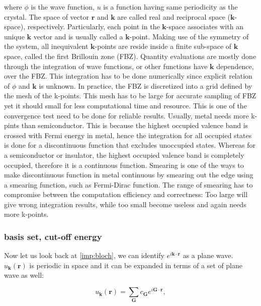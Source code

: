 where $\phi$ is the wave function, $u$ is a function having same periodicity as the crystal. The space of vector $\mathbf{r}$ and $\mathbf{k}$ are called real and reciprocal space ($\mathbf{k}$-space), respectively. Particularly, each point in the $\mathbf{k}$-space associates with an unique $\mathbf{k}$ vector and is usually called a $\mathbf{k}$-point. Making use of the symmetry of the system, all inequivalent $\mathbf{k}$-points are reside inside a finite sub-space of $\mathbf{k}$ space, called the first Brillouin zone (FBZ). Quantity evaluations are mostly done through the integration of wave functions, or other functions have $\mathbf{k}$ dependence, over the FBZ. This integration has to be done numerically since explicit relation of $\phi$ and $\mathbf{k}$ is unknown. In practice, the FBZ is discretized into a grid defined by the mesh of the k-points. This mesh has to be large for accurate sampling of FBZ yet it should small for less computational time and resource. This is one of the convergence test need to be done for reliable results. Usually, metal needs more k-pints than semiconductor. This is because the highest occupied valence band is crossed with Fermi energy in metal, hence the integration for all occupied states is done for a discontinuous function that excludes unoccupied states.  Whereas for a semiconductor or insulator, the highest occupied valence band is completely occupied, therefore it is a continuous function. Smearing is one of the ways to make discontinuous function in metal continuous by smearing out the edge using a smearing function, such as Fermi-Dirac function. The range of smearing has to compromise between the computation efficiency and correctness: Too large will give wrong integration results, while too small become useless and again needs more k-points.

\subsubsection{basis set, cut-off energy }

Now let us look back at \autoref{imp:bloch}, we can identify $e^{i\mathbf{k}\cdot\mathbf{r}}$ as a plane wave. $u_{\mathbf{k}}(\mathbf{r})$ is periodic in space and it can be expanded in terms of a set of plane wave as well:

\begin{equation}
u_{\mathbf{k}}(\mathbf{r})=\sum_{\mathbf{G}}c_{\mathbf{G}}e^{i\mathbf{G}\cdot\mathbf{r}},
\end{equation}

